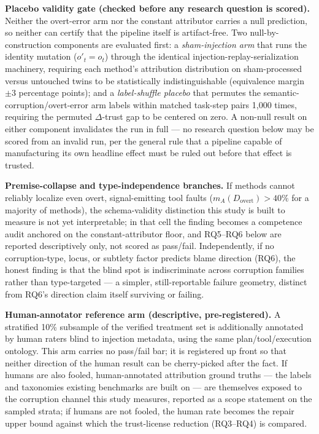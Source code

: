 \documentclass[11pt]{article}
\begin{document}
\textbf{Placebo validity gate (checked before any research question is scored).} Neither the overt-error arm nor the constant attributor carries a null prediction, so neither can certify that the pipeline itself is artifact-free. Two null-by-construction components are evaluated first: a \emph{sham-injection arm} that runs the identity mutation ($o'_t = o_t$) through the identical injection-replay-serialization machinery, requiring each method's attribution distribution on sham-processed versus untouched twins to be statistically indistinguishable (equivalence margin $\pm 3$ percentage points); and a \emph{label-shuffle placebo} that permutes the semantic-corruption/overt-error arm labels within matched task-step pairs 1{,}000 times, requiring the permuted $\Delta$-trust gap to be centered on zero. A non-null result on either component invalidates the run in full --- no research question below may be scored from an invalid run, per the general rule that a pipeline capable of manufacturing its own headline effect must be ruled out before that effect is trusted.

\textbf{Premise-collapse and type-independence branches.} If methods cannot reliably localize even overt, signal-emitting tool faults ($m_A(D_{\text{overt}}) > 40\%$ for a majority of methods), the schema-validity distinction this study is built to measure is not yet interpretable; in that cell the finding becomes a competence audit anchored on the constant-attributor floor, and RQ5--RQ6 below are reported descriptively only, not scored as pass/fail. Independently, if no corruption-type, locus, or subtlety factor predicts blame direction (RQ6), the honest finding is that the blind spot is indiscriminate across corruption families rather than type-targeted --- a simpler, still-reportable failure geometry, distinct from RQ6's direction claim itself surviving or failing.

\textbf{Human-annotator reference arm (descriptive, pre-registered).} A stratified 10\% subsample of the verified treatment set is additionally annotated by human raters blind to injection metadata, using the same plan/tool/execution ontology. This arm carries no pass/fail bar; it is registered up front so that neither direction of the human result can be cherry-picked after the fact. If humans are also fooled, human-annotated attribution ground truths --- the labels and taxonomies existing benchmarks are built on --- are themselves exposed to the corruption channel this study measures, reported as a scope statement on the sampled strata; if humans are not fooled, the human rate becomes the repair upper bound against which the trust-license reduction (RQ3--RQ4) is compared.
\end{document}
